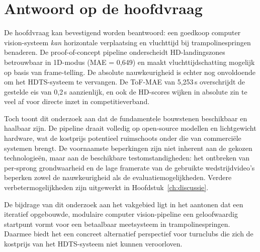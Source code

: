 \section*{Antwoord op de hoofdvraag}

De hoofdvraag kan bevestigend worden beantwoord: een goedkoop computer vision-systeem \textit{kan} horizontale verplaatsing en vluchttijd bij trampolinespringen benaderen. De proof-of-concept pipeline onderscheidt HD-landingszones betrouwbaar in 1D-modus (MAE = 0,649) en maakt vluchttijdschatting mogelijk op basis van frame-telling. De absolute nauwkeurigheid is echter nog onvoldoende om het HDTS-systeem te vervangen. De ToF-MAE van 5,253\,s overschrijdt de gestelde eis van 0,2\,s aanzienlijk, en ook de HD-scores wijken in absolute zin te veel af voor directe inzet in competitieverband.

Toch toont dit onderzoek aan dat de fundamentele bouwstenen beschikbaar en haalbaar zijn. De pipeline draait volledig op open-source modellen en lichtgewicht hardware, wat de kostprijs potentieel ruimschoots onder die van commerciële systemen brengt. De voornaamste beperkingen zijn niet inherent aan de gekozen technologieën, maar aan de beschikbare testomstandigheden: het ontbreken van per-sprong grondwaarheid en de lage framerate van de gebruikte wedstrijdvideo's beperken zowel de nauwkeurigheid als de evaluatiemogelijkheden. Verdere verbetermogelijkheden zijn uitgewerkt in Hoofdstuk~\ref{ch:discussie}.

De bijdrage van dit onderzoek aan het vakgebied ligt in het aantonen dat een iteratief opgebouwde, modulaire computer vision-pipeline een geloofwaardig startpunt vormt voor een betaalbaar meetsysteem in trampolinespringen. Daarmee biedt het een concreet alternatief perspectief voor turnclubs die zich de kostprijs van het HDTS-systeem niet kunnen veroorloven.
